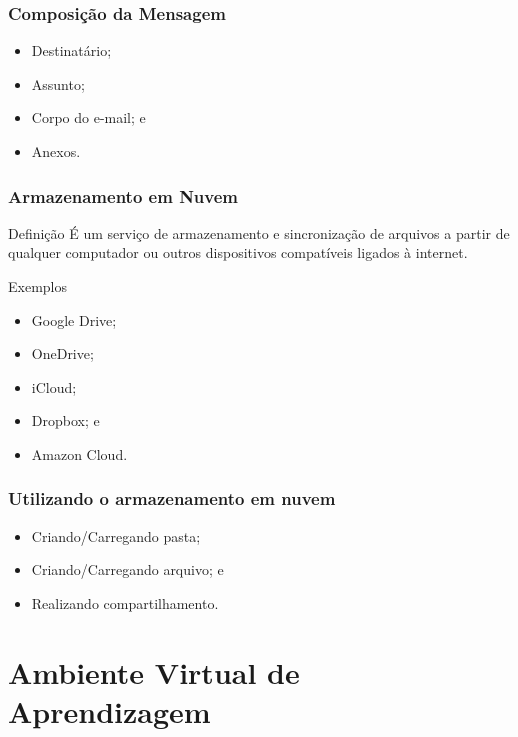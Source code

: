 \documentclass[aspectratio=169]{beamer} %
\begin{document}
\begin{frame}
	\frametitle{Composi\c cão da Mensagem}
	
	\begin{itemize}
		\item Destinatário;
		\item Assunto;
		\item Corpo do e-mail; e
		\item Anexos.
	\end{itemize}
\end{frame}

\begin{frame}
	\frametitle{Armazenamento em Nuvem}
	
	\begin{block}{Defini\c cão}
		É um serviço de armazenamento e sincronização de arquivos a partir de qualquer computador ou outros dispositivos compatíveis ligados à internet.
	\end{block} \vfill
	
	\begin{exampleblock}{Exemplos}
		\begin{itemize}
			\item Google Drive;
			\item OneDrive;
			\item iCloud; 
			\item Dropbox; e
			\item Amazon Cloud.
		\end{itemize}
	\end{exampleblock}
\end{frame}

\begin{frame}
	\frametitle{Utilizando o armazenamento em nuvem}
	
	\begin{itemize}
		\item Criando/Carregando pasta;
		\item Criando/Carregando arquivo; e
		\item Realizando compartilhamento.
	\end{itemize}
\end{frame}

\section{Ambiente Virtual de Aprendizagem}
\end{document}
